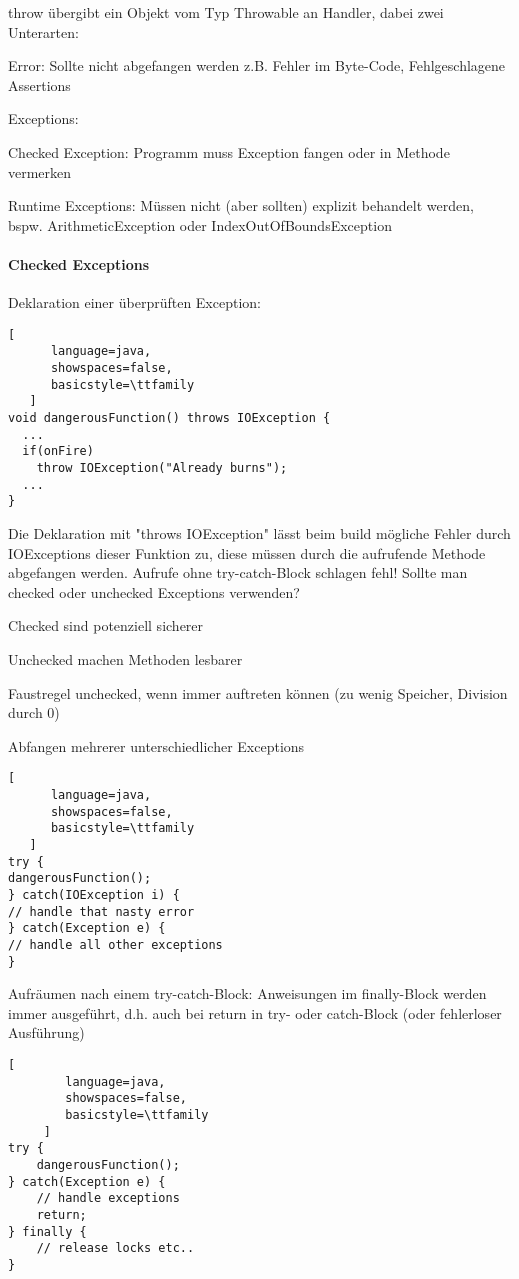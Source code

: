\documentclass[10pt]{article}
\begin{document}
\begin{itemize*}
throw übergibt ein Objekt vom Typ Throwable an Handler, dabei zwei Unterarten:
\begin{itemize*}
  \item Error: Sollte nicht abgefangen werden z.B. Fehler im Byte-Code, Fehlgeschlagene Assertions
  \item Exceptions:
  \begin{itemize*}
    \item Checked Exception: Programm muss Exception fangen oder in Methode vermerken
    \item Runtime Exceptions: Müssen nicht (aber sollten) explizit behandelt werden, bspw. ArithmeticException oder IndexOutOfBoundsException
  \end{itemize*}
\end{itemize*}

\paragraph{Checked Exceptions}
Deklaration einer überprüften Exception:
\begin{lstlisting}[
      language=java,
      showspaces=false,
      basicstyle=\ttfamily
   ]
void dangerousFunction() throws IOException {
  ...
  if(onFire)
    throw IOException("Already burns");
  ...
}
\end{lstlisting}

Die Deklaration mit "throws IOException" lässt beim build mögliche Fehler durch IOExceptions dieser Funktion zu, diese müssen durch die aufrufende Methode abgefangen werden.
Aufrufe ohne try-catch-Block schlagen fehl!
Sollte man checked oder unchecked Exceptions verwenden?
\begin{itemize*}
  \item Checked sind potenziell sicherer
  \item Unchecked machen Methoden lesbarer
  \item Faustregel unchecked, wenn immer auftreten können (zu wenig Speicher, Division durch 0)
\end{itemize*}

Abfangen mehrerer unterschiedlicher Exceptions
\begin{lstlisting}[
      language=java,
      showspaces=false,
      basicstyle=\ttfamily
   ]
try {
dangerousFunction();
} catch(IOException i) {
// handle that nasty error
} catch(Exception e) {
// handle all other exceptions
}
\end{lstlisting}

Aufräumen nach einem try-catch-Block: Anweisungen im finally-Block werden immer ausgeführt, d.h. auch bei
return in try- oder catch-Block (oder fehlerloser Ausführung)
\begin{lstlisting}[
        language=java,
        showspaces=false,
        basicstyle=\ttfamily
     ]
try {
    dangerousFunction();
} catch(Exception e) {
    // handle exceptions
    return;
} finally {
    // release locks etc..
}
\end{lstlisting}


\end{itemize*}
\end{document}
